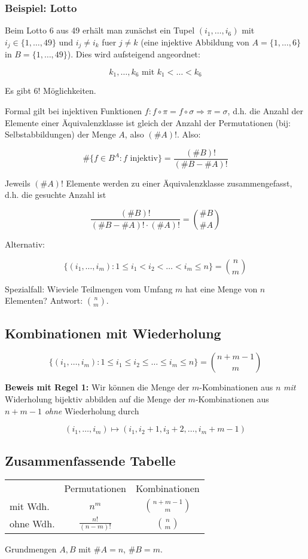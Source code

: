 \subsubsection{Beispiel: Lotto}

Beim Lotto 6 aus 49 erhält man zunächst ein Tupel $(i_1,\ldots,i_6)$ mit $i_j
\in \{1,\ldots,49\}$ und $i_j \neq i_k$ fuer $j \neq k$ (eine injektive
Abbildung von $A = \{1,\ldots,6\}$ in $B = \{1,\ldots,49\}$). Dies wird
aufsteigend angeordnet:

\[ k_1,\ldots,k_6 \text{ mit } k_1 < \ldots < k_6 \]

Es gibt $6!$ Möglichkeiten.

Formal gilt bei injektiven Funktionen $f : f \circ \pi = f \circ \sigma
\Rightarrow \pi = \sigma$, d.h. die Anzahl der Elemente einer Äquivalenzklasse
ist gleich der Anzahl der Permutationen (bij: Selbstabbildungen) der Menge
$A$, also $(\#A)!$. Also:

\[ \#\{ f \in B^A : f \text{ injektiv} \} = \frac{(\#B)!}{(\#B - \#A)!} \]

Jeweils $(\#A)!$ Elemente werden zu einer Äquivalenzklasse zusammengefasst,
d.h. die gesuchte Anzahl ist

\[ \frac{(\#B)!}{(\#B - \#A)! \cdot (\#A)!} = {\#B \choose \#A} \]

Alternativ:

\[ \{ (i_1,\ldots,i_m): 1 \leq i_1 < i_2 < \ldots < i_m \leq n \} = {n \choose
m} \]

Spezialfall: Wieviele Teilmengen vom Umfang $m$ hat eine Menge von $n$
Elementen? Antwort: $n \choose m$.


\subsection{Kombinationen mit Wiederholung}

\[ \{(i_1,\ldots,i_m): 1 \leq i_1 \leq i_2 \leq \ldots \leq i_m \leq n \} =
{n+m-1 \choose m} \]

\textbf{Beweis mit Regel 1:} Wir können die Menge der $m$-Kombinationen aus
$n$ \emph{mit} Widerholung bijektiv abbilden auf die Menge der
$m$-Kombinationen aus $n+m-1$ \emph{ohne} Wiederholung durch

\[ (i_1,\ldots,i_m) \mapsto (i_1, i_2+1, i_3+2, \ldots, i_m + m-1) \]


\subsection{Zusammenfassende Tabelle}

\begin{center}
\begin{tabular}{l|c|c}
    ~         & Permutationen       & Kombinationen     \\
    \cline{2-3}
    mit Wdh.  & $n^m$               & $n+m-1 \choose m$ \\
    ohne Wdh. & $\frac{n!}{(n-m)!}$ & $n \choose m$     \\
\end{tabular}
\end{center}

{\scriptsize Grundmengen $A,B$ mit $\#A=n$, $\#B=m$.}


